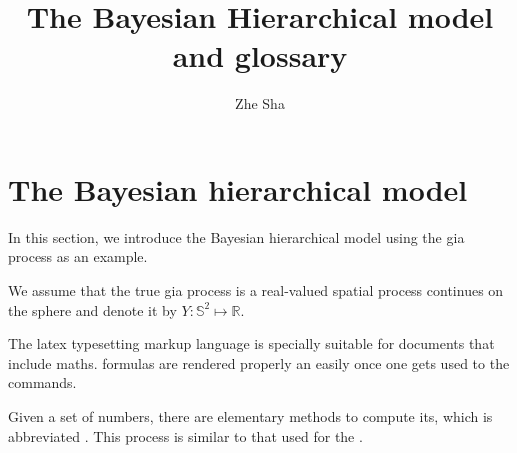 \documentclass[a4paper,12pt]{article}
\begin{document}
 \title{The Bayesian Hierarchical model and glossary}
\author{Zhe Sha}
\maketitle

\onehalfspacing
{}
\section{The Bayesian hierarchical model}
In this section, we introduce the Bayesian hierarchical model using the \acrshort{gia} process as an example. 

We assume that the true \acrshort{gia} process is a real-valued spatial process continues on the sphere and denote it by $Y: \mathbb{S}^2 \mapsto \mathbb{R}$. 





The \Gls{latex} typesetting markup language is specially suitable 
for documents that include \gls{maths}. \Glspl{formula} are 
rendered properly an easily once one gets used to the commands.
 
Given a set of numbers, there are elementary methods to compute 
its, which is abbreviated . This 
process is similar to that used for the .
 
 
\clearpage
 
\printglossary[type=\acronymtype]
 
\printglossary
 
\end{document}
